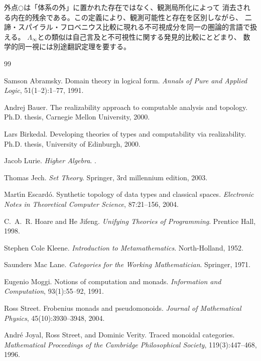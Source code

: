 \documentclass[11pt,a4paper]{ltjsarticle}
\theoremstyle{definition}
\newcommand{\LawvereInfinity}{\Lambda_\infty}
\begin{document}
外点$\bigcirc$は「体系の外」に置かれた存在ではなく、観測局所化によって
消去される内在的残余である。この定義により、観測可能性と存在を区別しながら、
二諦・スパイラル・フロベニウス比較に現れる不可視成分を同一の圏論的言語で扱える。
$\LawvereInfinity$との類似は自己言及と不可視性に関する発見的比較にとどまり、
数学的同一視には別途翻訳定理を要する。

\begin{thebibliography}{99}

Samson Abramsky.
\newblock Domain theory in logical form.
\newblock \emph{Annals of Pure and Applied Logic}, 51(1--2):1--77, 1991.

Andrej Bauer.
\newblock The realizability approach to computable analysis and topology.
\newblock Ph.D. thesis, Carnegie Mellon University, 2000.

Lars Birkedal.
\newblock Developing theories of types and computability via realizability.
\newblock Ph.D. thesis, University of Edinburgh, 2000.

Jacob Lurie.
\newblock \emph{Higher Algebra}.
.

Thomas Jech.
\newblock \emph{Set Theory}.
\newblock Springer, 3rd millennium edition, 2003.

Mart\'{\i}n Escard\'{o}.
\newblock Synthetic topology of data types and classical spaces.
\newblock \emph{Electronic Notes in Theoretical Computer Science}, 87:21--156, 2004.

C.~A.~R. Hoare and He Jifeng.
\newblock \emph{Unifying Theories of Programming}.
\newblock Prentice Hall, 1998.

Stephen Cole Kleene.
\newblock \emph{Introduction to Metamathematics}.
\newblock North-Holland, 1952.

Saunders Mac Lane.
\newblock \emph{Categories for the Working Mathematician}.
\newblock Springer, 1971.

Eugenio Moggi.
\newblock Notions of computation and monads.
\newblock \emph{Information and Computation}, 93(1):55--92, 1991.

Ross Street.
\newblock Frobenius monads and pseudomonoids.
\newblock \emph{Journal of Mathematical Physics}, 45(10):3930--3948, 2004.

Andr\'{e} Joyal, Ross Street, and Dominic Verity.
\newblock Traced monoidal categories.
\newblock \emph{Mathematical Proceedings of the Cambridge Philosophical Society},
  119(3):447--468, 1996.


\end{thebibliography}
\end{document}
